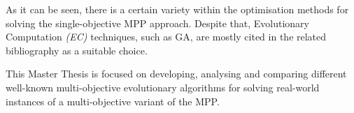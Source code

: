 As it can be seen, there is a certain variety within the optimisation methods for solving the single-objective MPP approach. Despite that, Evolutionary Computation \textit{(EC)} techniques, such as GA, are mostly cited in the related bibliography as a suitable choice\cite{Ngo2016, Seljak2009, Moreira2018}.

This Master Thesis is focused on developing, analysing and comparing different well-known multi-objective evolutionary algorithms for solving real-world instances of a multi-objective variant of the MPP.